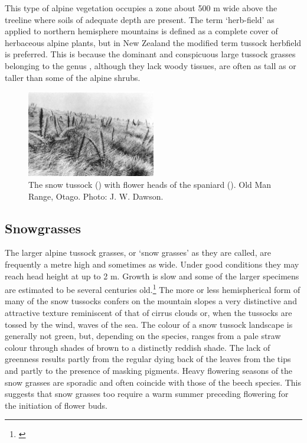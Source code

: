 This type of alpine vegetation occupies a zone about 500 m wide above the treeline where soils of adequate depth are present.
The term `herb-field' as applied to northern hemisphere mountains is defined as a complete cover of herbaceous alpine plants, but in New Zealand the modified term tussock herbfield is preferred.
This is because the dominant and conspicuous large tussock grasses belonging to the genus , although they lack woody tissues, are often as tall as or taller than some of the alpine shrubs.

\begin{figure}
	\includegraphics[width=0.5\textwidth]{graphics/figure96snow-tussock.jpg}
	\centering
	\caption[Snow tussock]{The snow tussock () with flower heads of the spaniard ().
	Old Man Range, Otago.
	Photo: J. W. Dawson.}%
	\label{fig:96snow-tussock}
\end{figure}

\subsection{Snowgrasses}

The larger alpine tussock grasses, or `snow grasses' as they are called, are frequently a metre high and sometimes as wide.
Under good conditions they may reach head height at up to 2 m.
Growth is slow and some of the larger specimens are estimated to be several centuries old.\footnote{\cite{mark1974snow}}
The more or less hemispherical form of many of the snow tussocks confers on the mountain slopes a very distinctive and attractive texture reminiscent of that of cirrus clouds or, when the tussocks are tossed by the wind, waves of the sea.
The colour of a snow tussock landscape is generally not green, but, depending on the species, ranges from a pale straw colour through shades of brown to a distinctly reddish shade.
The lack of greenness results partly from the regular dying back of the leaves from the tips and partly to the presence of masking pigments.
Heavy flowering seasons of the snow grasses are sporadic and often coincide with those of the beech species.
This suggests that snow grasses too require a warm summer preceding flowering for the initiation of flower buds.

